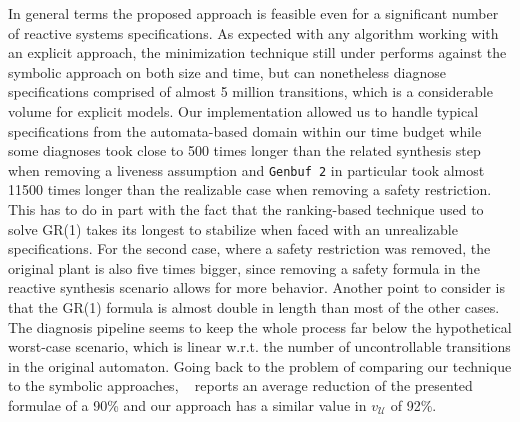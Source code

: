 In general terms the proposed approach is feasible even for a significant number of reactive systems specifications. 
As expected with any algorithm working with an explicit approach, the minimization technique still under performs against the symbolic approach on both size and time, but can nonetheless diagnose specifications comprised of almost 5 million transitions, which is a considerable volume for explicit models.  
Our implementation allowed us to handle typical specifications from the automata-based domain within our time budget while some diagnoses took close to 500 times longer than the related synthesis step when removing a liveness assumption and \texttt{Genbuf 2} in particular took almost 11500 times longer than the realizable case when removing a safety restriction. This has to do in part with the fact that the ranking-based technique used to solve GR(1) takes its longest to stabilize when faced with an unrealizable specifications. For the second case, where a safety restriction was removed, the original plant is also five times bigger, since removing a safety formula in the reactive synthesis scenario allows for more behavior. Another point to consider is that the GR(1) formula is almost double in length than most of the other cases. 
The diagnosis pipeline seems to keep the whole process far below the hypothetical worst-case scenario, which is linear w.r.t. the number of uncontrollable transitions in the original automaton.  
Going back to the problem of comparing our technique to the symbolic approaches, ~\cite{DBLP:conf/hvc/KonighoferHB10} reports an average reduction of the presented formulae of a 90\% and our approach has a similar value in $v_{\mathcal{U}}$ of 92\%.
